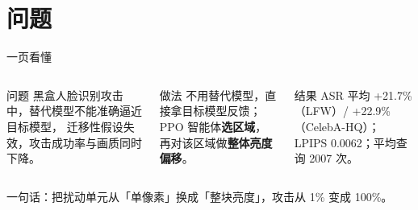 

\section{问题}

\begin{frame}{一页看懂}
  \vspace{-3.6em}
  \begin{columns}[T]
    \begin{block}{问题}
      黑盒人脸识别攻击中，替代模型\alert{不能}准确逼近目标模型，
      迁移性假设失效，攻击成功率与画质同时下降。
    \end{block}

    \begin{block}{做法}
      不用替代模型，直接拿目标模型反馈；
      PPO 智能体\textbf{选区域}，再对该区域做\textbf{整体亮度偏移}。
    \end{block}

    \begin{block}{结果}
      ASR 平均 \alert{+21.7\%}（LFW）/ +22.9\%（CelebA-HQ）；
      LPIPS \alert{0.0062}；平均查询 \alert{2007} 次。
    \end{block}
  \end{columns}

  \vspace{1.2em}
  \begin{center}
    \small 一句话：把扰动单元从「单像素」换成「整块亮度」，攻击从 1\% 变成 100\%。
  \end{center}
\end{frame}

